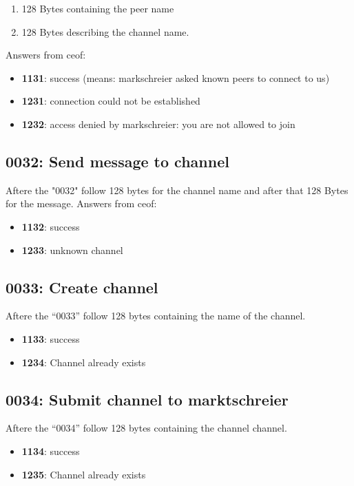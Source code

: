 \documentclass[12pt,a4paper]{article}
\begin{document}
\begin{enumerate}
\item 128 Bytes containing the peer name
\item 128 Bytes describing the channel name.
\end{enumerate}

Answers from ceof:
\begin{itemize}
\item \textbf{1131}: success (means: markschreier asked known peers to
connect to us)
\item \textbf{1231}: connection could not be established
\item \textbf{1232}: access denied by markschreier: you are not allowed to join
\end{itemize}
\subsection{0032: Send message to channel}
Aftere the "0032" follow 128 bytes for the channel name and after
that 128 Bytes for the message.
Answers from ceof:
\begin{itemize}
\item \textbf{1132}: success
\item \textbf{1233}: unknown channel
\end{itemize}
\subsection{0033: Create channel}
Aftere the "`0033"' follow 128 bytes containing the name of the channel.
\begin{itemize}
\item \textbf{1133}: success
\item \textbf{1234}: Channel already exists
\end{itemize}
\subsection{0034: Submit channel to marktschreier}
Aftere the "`0034"' follow 128 bytes containing the channel channel.
\begin{itemize}
\item \textbf{1134}: success
\item \textbf{1235}: Channel already exists
\end{itemize}
\end{document}
